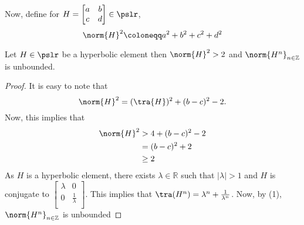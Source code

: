 Now, define for $H = \begin{bmatrix}
	a & b \\
	c & d \\ 
\end{bmatrix} \in \pslr$, $$\norm{H}^2 \coloneqq a^2+b^2+c^2+d^2$$
\begin{lem}
	\label{lem:norm}
	Let $H \in \pslr$ be a hyperbolic element then $\norm{H}^2 > 2$ and $\norm{H^n}_{n \in \mathbb{Z}}$ is unbounded.
\end{lem}
\begin{proof}
	It is easy to note that \begin{equation}
		\norm{H}^2 = (\tra{H})^2 + (b-c)^2 - 2.
	\end{equation} 
	Now, this implies that
	\begin{align*}
		\norm{H}^2 &> 4 + (b-c)^2 - 2 \\
		&= (b-c)^2 + 2 \\
		&\geq 2
	\end{align*}
As $H$ is a hyperbolic element, there exists $\lambda \in \mathbb{R}$ such that $|\lambda| > 1$ and $H$ is conjugate to 
$\begin{bmatrix}
	\lambda & 0 \\
	0 & \frac{1}{ \lambda } \\ 
\end{bmatrix}$. This implies that $\tra(H^n) = \lambda^n + \frac{1}{\lambda^n}$. Now, by (1), $\norm{H^n}_{n \in \mathbb{Z}}$ is unbounded

\end{proof}

